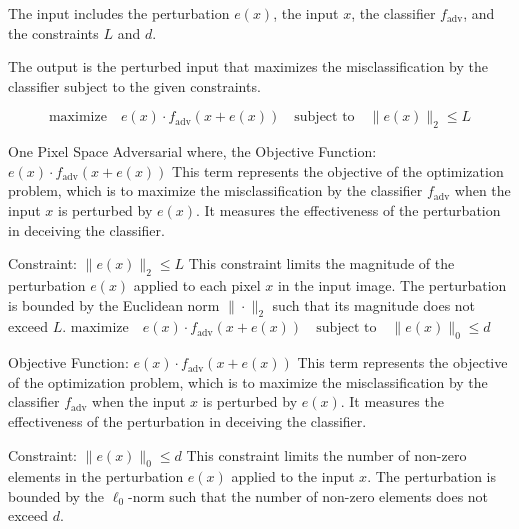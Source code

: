 The input includes the perturbation $e(x)$, the input $x$, the classifier $f_{\text{adv}}$, and the constraints $L$ and $d$.

The output is the perturbed input that maximizes the misclassification by the classifier subject to the given constraints.

\begin{equation*}
  \text{maximize} \quad e(x) \cdot f_{\text{adv}}(x + e(x))
  \quad \text{subject to} \quad \| e(x) \|_2 \leq L
\end{equation*}

One Pixel Space Adversarial where, the Objective Function:
$e(x) \cdot f_{\text{adv}}(x + e(x))$
This term represents the objective of the optimization problem, which is to maximize the misclassification by the classifier $f_{\text{adv}}$ when the input $x$ is perturbed by $e(x)$. It measures the effectiveness of the perturbation in deceiving the classifier.

Constraint:
$\| e(x) \|_2 \leq L$
This constraint limits the magnitude of the perturbation $e(x)$ applied to each pixel $x$ in the input image. The perturbation is bounded by the Euclidean norm $\| \cdot \|_2$ such that its magnitude does not exceed $L$.
$\text{maximize} \quad e(x) \cdot f_{\text{adv}}(x + e(x))
  \quad \text{subject to} \quad \| e(x) \|_0 \leq d$

Objective Function:
$e(x) \cdot f_{\text{adv}}(x + e(x))$
This term represents the objective of the optimization problem, which is to maximize the misclassification by the classifier $f_{\text{adv}}$ when the input $x$ is perturbed by $e(x)$. It measures the effectiveness of the perturbation in deceiving the classifier.

Constraint:
$\| e(x) \|_0 \leq d$
This constraint limits the number of non-zero elements in the perturbation $e(x)$ applied to the input $x$. The perturbation is bounded by the $\ell_0$-norm such that the number of non-zero elements does not exceed $d$.
